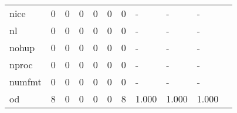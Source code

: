 \begin{longtable}{lp{1.20cm}p{1.20cm}p{1.20cm}p{1.20cm}p{1.20cm}p{1.20cm}p{1.20cm}p{1.20cm}p{1.20cm}p{1.20cm}}
nice      &                                     0 &                                                  0 &                                                  0 &                                                  0 &                                                  0 &                                                  0 &                                             - &                                                  - &                                                  - \\
nl        &                                     0 &                                                  0 &                                                  0 &                                                  0 &                                                  0 &                                                  0 &                                             - &                                                  - &                                                  - \\
nohup     &                                     0 &                                                  0 &                                                  0 &                                                  0 &                                                  0 &                                                  0 &                                             - &                                                  - &                                                  - \\
nproc     &                                     0 &                                                  0 &                                                  0 &                                                  0 &                                                  0 &                                                  0 &                                             - &                                                  - &                                                  - \\
numfmt    &                                     0 &                                                  0 &                                                  0 &                                                  0 &                                                  0 &                                                  0 &                                             - &                                                  - &                                                  - \\
od        &                                     8 &                                                  0 &                                                  0 &                                                  0 &                                                  0 &                                                  8 &                                         1.000 &                                              1.000 &                                              1.000 \\

\end{longtable}
